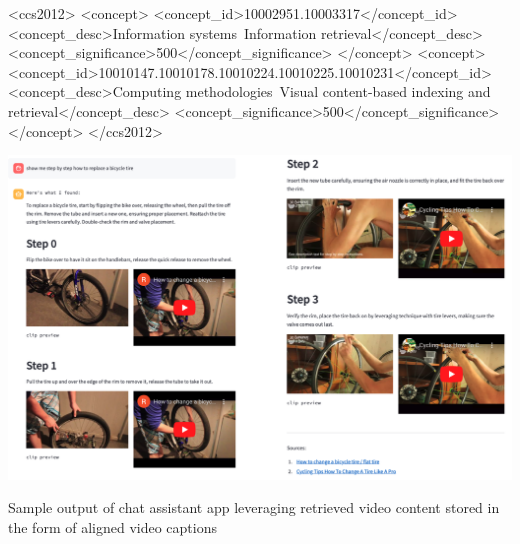 \documentclass[sigconf]{acmart}
\begin{document}
	\begin{CCSXML}\begin{CCSXML}
			<ccs2012>
			<concept>
			<concept_id>10002951.10003317</concept_id>
			<concept_desc>Information systems~Information retrieval</concept_desc>
			<concept_significance>500</concept_significance>
			</concept>
			<concept>
			<concept_id>10010147.10010178.10010224.10010225.10010231</concept_id>
			<concept_desc>Computing methodologies~Visual content-based indexing and retrieval</concept_desc>
			<concept_significance>500</concept_significance>
			</concept>
			</ccs2012>
		\end{CCSXML}
		
		
		
		\begin{teaserfigure}
			\includegraphics[width=\textwidth]{teaser}
			\caption{Sample output of chat assistant app leveraging retrieved video content stored in the form of aligned video captions} 
			\label{fig:teaser}
		\end{teaserfigure}
		
		

\end{CCSXML}
\end{document}
